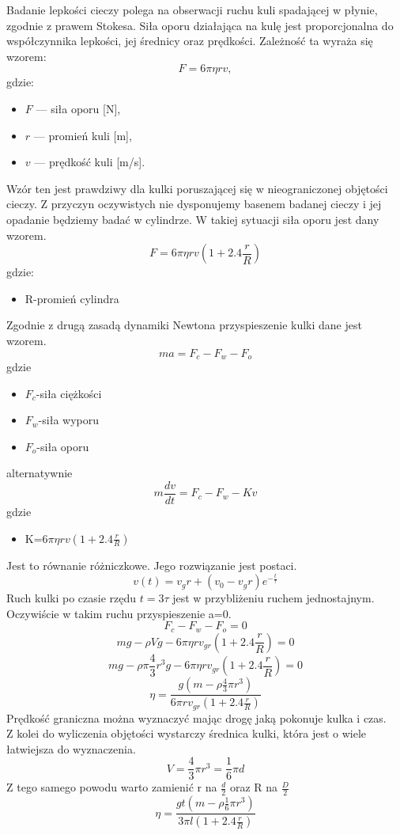 \documentclass[12pt]{article}
\begin{document}
\vspace{0.5cm}

Badanie lepkości cieczy polega na obserwacji ruchu kuli spadającej w płynie, zgodnie z prawem Stokesa. Siła oporu działająca na kulę jest proporcjonalna do współczynnika lepkości, jej średnicy oraz prędkości. Zależność ta wyraża się wzorem:
\[
F = 6 \pi \eta r v,
\]
gdzie:
\begin{itemize}
    \item \(F\) — siła oporu [N],
    \item \(r\) — promień kuli [m],
    \item \(v\) — prędkość kuli [m/s].
\end{itemize}

\vspace{0.5cm}
Wzór ten jest prawdziwy dla kulki poruszającej się w nieograniczonej objętości cieczy. Z przyczyn oczywistych nie dysponujemy basenem badanej cieczy i jej opadanie będziemy badać w cylindrze. W takiej sytuacji siła oporu jest dany wzorem.
\[F=6\pi\eta rv(1+2.4\frac{r}{R})\]
gdzie:
\begin{itemize}
    \item R-promień cylindra
\end{itemize}
Zgodnie z drugą zasadą dynamiki Newtona przyspieszenie kulki dane jest wzorem.
\[ma=F_c-F_w-F_o\]
gdzie
\begin{itemize}
    \item $F_c$-siła ciężkości
    \item $F_w$-siła wyporu
    \item $F_o$-siła oporu
\end{itemize}
alternatywnie
\[m\frac{dv}{dt}=F_c-F_w-Kv\]
gdzie
\begin{itemize}
    \item K=$6\pi\eta rv(1+2.4\frac{r}{R})$
\end{itemize}
Jest to równanie różniczkowe. Jego rozwiązanie jest postaci.
\[v(t)=v_gr+(v_0-v_gr)e^{-\frac{t}{\tau}}\]
Ruch kulki po czasie rzędu $t=3\tau$ jest w przybliżeniu ruchem jednostajnym. Oczywiście w takim ruchu przyspieszenie a=0.
\[F_c-F_w-F_o=0\]
\[mg-\rho Vg-6\pi\eta rv_{gr}(1+2.4\frac{r}{R})=0\]
\[mg-\rho\pi\frac{4}{3}r^3g-6\pi\eta rv_{gr}(1+2.4\frac{r}{R})=0\]
\[\eta=\frac{g(m-\rho\frac{4}{3}\pi r^3)}{6\pi rv_{gr}(1+2.4\frac{r}{R})}\]
Prędkość graniczna można wyznaczyć mając drogę jaką pokonuje kulka i czas.\\
Z kolei do wyliczenia objętości wystarczy średnica kulki, która jest o wiele łatwiejsza do wyznaczenia.
\[V=\frac{4}{3}\pi r^3=\frac{1}{6}\pi d\]
Z tego samego powodu warto zamienić r na $\frac{d}{2}$ oraz R na $\frac{D}{2}$
\[\eta=\frac{gt(m-\rho\frac{1}{6}\pi r^3)}{3\pi l(1+2.4\frac{r}{R})}\]
\end{document}
